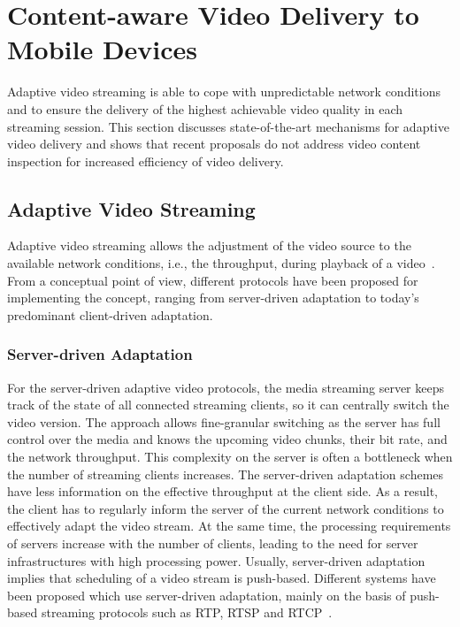 \section{Content-aware Video Delivery to Mobile Devices}
\label{sec:250_background_content_aware_delivery}
Adaptive video streaming is able to cope with unpredictable network conditions and to ensure the delivery of the highest achievable video quality in each streaming session.
This section discusses state-of-the-art mechanisms for adaptive video delivery and shows that recent proposals do not address video content inspection for increased efficiency of video delivery.
\subsection{Adaptive Video Streaming}
\label{sec:250_AdaptiveVideo}
Adaptive video streaming allows the adjustment of the video source to the available network conditions, i.e., the throughput, during playback of a video~\cite{DeCicco2010}.
From a conceptual point of view, different protocols have been proposed for implementing the concept, ranging from server-driven adaptation to today's predominant client-driven adaptation. 
\subsubsection{Server-driven Adaptation}
For the server-driven adaptive video protocols, the media streaming server keeps track of the state of all connected streaming clients, so it can centrally switch the video version.
The approach allows fine-granular switching as the server has full control over the media and knows the upcoming video chunks, their bit rate, and the network throughput.
This complexity on the server is often a bottleneck when the number of streaming clients increases.
The server-driven adaptation schemes have less information on the effective throughput at the client side.
As a result, the client has to regularly inform the server of the current network conditions to effectively adapt the video stream.
At the same time, the processing requirements of servers increase with the number of clients, leading to the need for server infrastructures with high processing power. 
Usually, server-driven adaptation implies that scheduling of a video stream is push-based.
Different systems have been proposed which use server-driven adaptation, mainly on the basis of push-based streaming protocols such as \ac{RTP}, \ac{RTSP} and \ac{RTCP}~\cite{Fiandrotti2010,Liu2003,Wien2007}.
